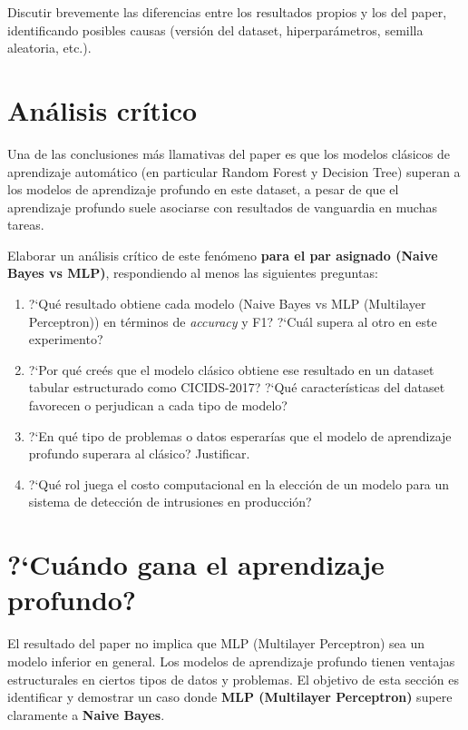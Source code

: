 \documentclass[11pt,a4paper]{article}
\begin{document}
Discutir brevemente las diferencias entre los resultados propios y los del paper, identificando posibles causas (versi\'on del dataset, hiperpar\'ametros, semilla aleatoria, etc.).

\section{An\'alisis cr\'itico}
Una de las conclusiones m\'as llamativas del paper es que los modelos cl\'asicos de aprendizaje autom\'atico (en particular Random Forest y Decision Tree) superan a los modelos de aprendizaje profundo en este dataset, a pesar de que el aprendizaje profundo suele asociarse con resultados de vanguardia en muchas tareas.

Elaborar un an\'alisis cr\'itico de este fen\'omeno \textbf{para el par asignado (Naive Bayes vs MLP)}, respondiendo al menos las siguientes preguntas:
\begin{enumerate}[leftmargin=2em,itemsep=2pt]
    \item ?`Qu\'e resultado obtiene cada modelo (Naive Bayes vs MLP (Multilayer Perceptron)) en t\'erminos de \textit{accuracy} y F1? ?`Cu\'al supera al otro en este experimento?
    \item ?`Por qu\'e cre\'es que el modelo cl\'asico obtiene ese resultado en un dataset tabular estructurado como CICIDS-2017? ?`Qu\'e caracter\'isticas del dataset favorecen o perjudican a cada tipo de modelo?
    \item ?`En qu\'e tipo de problemas o datos esperar\'ias que el modelo de aprendizaje profundo superara al cl\'asico? Justificar.
    \item ?`Qu\'e rol juega el costo computacional en la elecci\'on de un modelo para un sistema de detecci\'on de intrusiones en producci\'on?
\end{enumerate}

\section{?`Cu\'ando gana el aprendizaje profundo?}
El resultado del paper no implica que MLP (Multilayer Perceptron) sea un modelo inferior en general. Los modelos de aprendizaje profundo tienen ventajas estructurales en ciertos tipos de datos y problemas. El objetivo de esta secci\'on es identificar y demostrar un caso donde \textbf{MLP (Multilayer Perceptron)} supere claramente a \textbf{Naive Bayes}.
\end{document}
